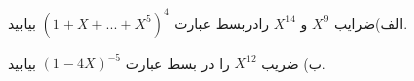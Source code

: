 \exercise
الف)ضرایب 
$X^9$
و
$X^{14}$
رادربسط عبارت 
$(1 + X + ... + X^5)^4$
بیابید.

ب) ضریب
$X^12$
 را در بسط عبارت 
$(1 - 4X)^{-5}$
بیابید.